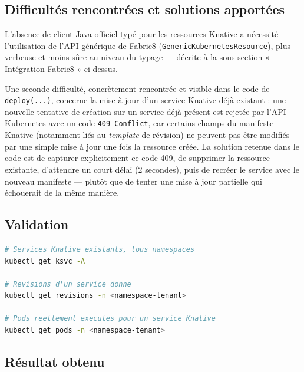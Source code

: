 \subsection{Difficultés rencontrées et solutions apportées}

L'absence de client Java officiel typé pour les ressources Knative a nécessité l'utilisation de l'API générique de Fabric8 (\texttt{GenericKubernetesResource}), plus verbeuse et moins sûre au niveau du typage — décrite à la sous-section « Intégration Fabric8 » ci-dessus.

Une seconde difficulté, concrètement rencontrée et visible dans le code de \texttt{deploy(...)}, concerne la mise à jour d'un service Knative déjà existant : une nouvelle tentative de création sur un service déjà présent est rejetée par l'API Kubernetes avec un code \texttt{409 Conflict}, car certains champs du manifeste Knative (notamment liés au \textit{template} de révision) ne peuvent pas être modifiés par une simple mise à jour une fois la ressource créée. La solution retenue dans le code est de capturer explicitement ce code 409, de supprimer la ressource existante, d'attendre un court délai (2 secondes), puis de recréer le service avec le nouveau manifeste — plutôt que de tenter une mise à jour partielle qui échouerait de la même manière.

\subsection{Validation}

\begin{lstlisting}[language=bash, caption={Commandes de validation de Knative Serving (Sprint 1)}, label={lst:validation-sprint1}]
# Services Knative existants, tous namespaces
kubectl get ksvc -A

# Revisions d'un service donne
kubectl get revisions -n <namespace-tenant>

# Pods reellement executes pour un service Knative
kubectl get pods -n <namespace-tenant>
\end{lstlisting}


\subsection{Résultat obtenu}

